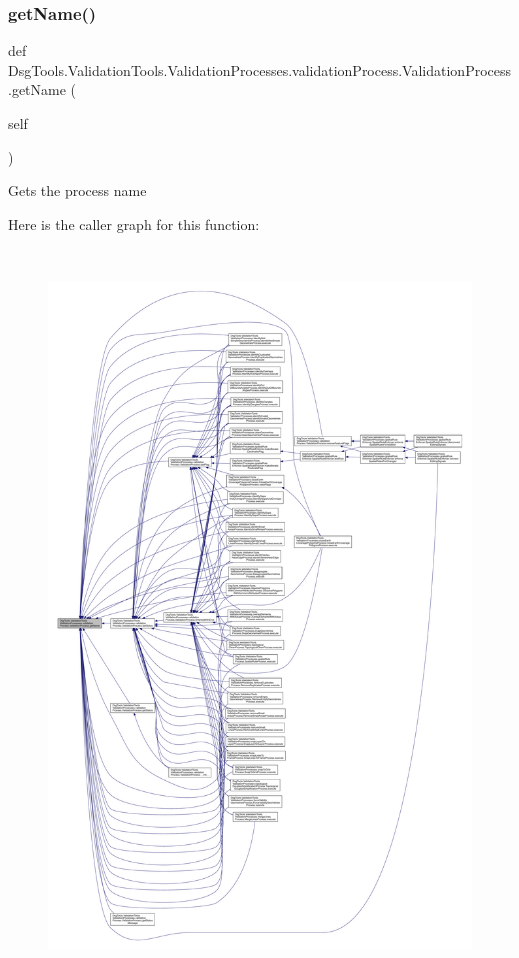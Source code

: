 \subsubsection{\texorpdfstring{get\+Name()}{getName()}}
{\footnotesize\ttfamily def Dsg\+Tools.\+Validation\+Tools.\+Validation\+Processes.\+validation\+Process.\+Validation\+Process.\+get\+Name (\begin{DoxyParamCaption}\item[{}]{self }\end{DoxyParamCaption})}

\begin{DoxyVerb}Gets the process name
\end{DoxyVerb}
 Here is the caller graph for this function\+:
\nopagebreak
\begin{figure}[H]
\begin{center}
\leavevmode
\includegraphics[height=550pt]{class_dsg_tools_1_1_validation_tools_1_1_validation_processes_1_1validation_process_1_1_validation_process_a1d1df94ebe9093d378f200c33192cd6e_icgraph}
\end{center}
\end{figure}
